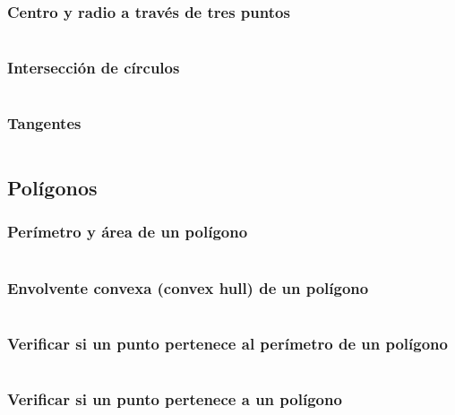 \documentclass[11pt]{article}
\begin{document}
			\subsubsection{Centro y radio a través de tres puntos}
			\inputminted[tabsize=2,breaklines,firstline=424,lastline=429,fontsize=\small]{c++}{geometry.cpp}
			
			\subsubsection{Intersección de círculos}
			\inputminted[tabsize=2,breaklines,firstline=431,lastline=448,fontsize=\small]{c++}{geometry.cpp}
			
			\subsubsection{Tangentes}
			\inputminted[tabsize=2,breaklines,firstline=450,lastline=494,fontsize=\small]{c++}{geometry.cpp}
		
		\subsection{Polígonos}
			\subsubsection{Perímetro y área de un polígono}
			\inputminted[tabsize=2,breaklines,firstline=174,lastline=190,fontsize=\small]{c++}{geometry.cpp}
			
			\subsubsection{Envolvente convexa (convex hull) de un polígono}
			\inputminted[tabsize=2,breaklines,firstline=192,lastline=211,fontsize=\small]{c++}{geometry.cpp}
			
			\subsubsection{Verificar si un punto pertenece al perímetro de un polígono}
			\inputminted[tabsize=2,breaklines,firstline=213,lastline=221,fontsize=\small]{c++}{geometry.cpp}
			
			\subsubsection{Verificar si un punto pertenece a un polígono}
			\inputminted[tabsize=2,breaklines,firstline=223,lastline=234,fontsize=\small]{c++}{geometry.cpp}
			
\end{document}
